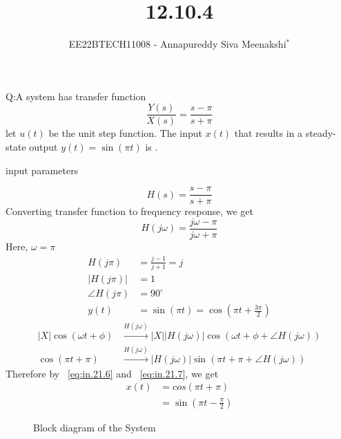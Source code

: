 \documentclass[journal,12pt,twocolumn]{IEEEtran}
\newcommand{\system}[1]{\stackrel{#1}{\rightarrow}}
\theoremstyle{remark}
\begin{document}

\vspace{3cm}

\title{12.10.4}
\author{EE22BTECH11008 - Annapureddy Siva Meenakshi$^{*}$%
}
\maketitle
\bigskip

\renewcommand{\thefigure}{\theenumi}
\renewcommand{\thetable}{\theenumi}
Q:A system has transfer function
 \[\frac{Y(s)}{X(s)}=\frac {s-\pi}{s+\pi}\]
 let $u(t)$ be the unit step function. The input $x(t)$ that results in a steady-state output $y(t)=\sin(\pi t)$ is \underline{\quad}.
\solution
\begin{table}[!ht]
    \centering
        
    \caption{input parameters}
    \label{tab:in_21_t1}
\end{table}
 \begin{equation}
     H(s)=\frac{s-\pi}{s+\pi}
 \end{equation} 
 Converting transfer function to frequency response, we get
 \begin{equation}
     H(j\omega)=\frac{j\omega-\pi}{j\omega+\pi}
 \end{equation}
 Here, $\omega=\pi$
 \begin{align}
    H(j\pi)&=\frac{j-1}{j+1}=j\\
     |H(j\pi)|&=1\\
    \angle H(j\pi)&=90^\circ\\
    y(t)&=\sin(\pi t)=\cos(\pi t+\frac{3\pi}{2})\label{eq:in.21.6} 
\end{align}
\begin{align}
  |X|\cos(\omega t+\phi)&\system{H(j\omega)}|X||H(j\omega)|\cos(\omega t +\phi +\angle H(j\omega))\label{eq:in.21.7}\\
  \cos(\pi t+\pi)&\system{H(j\omega)}|H(j\omega)|\sin(\pi t +\pi +\angle H(j\omega))
\end{align}
Therefore by ~\eqref{eq:in.21.6} and ~\eqref{eq:in.21.7}, we get
\begin{align}
    x(t)&=cos(\pi t+\pi)\\
    &=\sin\left(\pi t -\frac{\pi}{2}\right)
\end{align}

\begin{figure}[htb]
  \centering
  
  \captionsetup{justification=centering, singlelinecheck=off}
  \caption{Block diagram of the System}
  \label{fig:tikz_circuit}
\end{figure}
\end{document}
